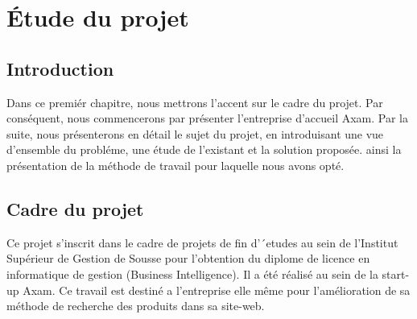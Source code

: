 \renewcommand\labelitemii{$\m\bullet$}
\section{Étude du projet}

\subsection{Introduction}
\noindent
Dans ce premiér chapitre, nous mettrons l’accent sur le cadre du projet. Par conséquent, nous commencerons par présenter l’entreprise d’accueil Axam. Par la suite, nous présenterons en détail le sujet du projet, en introduisant une vue d’ensemble du probléme, une étude de l’existant et la solution proposée. ainsi la présentation de la méthode de travail pour laquelle nous avons opté.

\subsection{Cadre du projet}
\noindent
Ce projet s’inscrit dans le cadre de projets de fin d’´etudes au sein de l’Institut Supérieur de Gestion de Sousse pour l’obtention du diplome de
licence en informatique de gestion (Business Intelligence). Il a été réalisé au sein de la start-up Axam. Ce travail est destiné a l'entreprise elle même pour l'amélioration de sa méthode de recherche des produits dans sa site-web.









